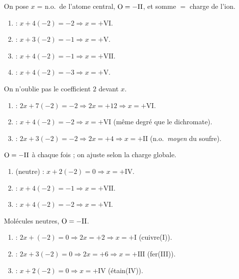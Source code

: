 \documentclass[11pt,a4paper]{article}
\begin{document}
\begin{corrige}
On pose $x$ = n.o.\ de l'atome central, $\ce{O}=-\mathrm{II}$, et somme $=$ charge de l'ion.
\begin{enumerate}[label=\alph*)]
  \item {} : $x+4(-2)=-2 \Rightarrow x=+\mathrm{VI}$.
  \item {} : $x+3(-2)=-1 \Rightarrow x=+\mathrm{V}$.
  \item {} : $x+4(-2)=-1 \Rightarrow x=+\mathrm{VII}$.
  \item {} : $x+4(-2)=-3 \Rightarrow x=+\mathrm{V}$.
\end{enumerate}
\end{corrige}

\begin{corrige}
On n'oublie pas le coefficient $2$ devant $x$.
\begin{enumerate}[label=\alph*)]
  \item {} : $2x+7(-2)=-2 \Rightarrow 2x=+12 \Rightarrow x=+\mathrm{VI}$.
  \item {} : $x+4(-2)=-2 \Rightarrow x=+\mathrm{VI}$ (même degré que le dichromate).
  \item {} : $2x+3(-2)=-2 \Rightarrow 2x=+4 \Rightarrow x=+\mathrm{II}$ (n.o.\ \emph{moyen} du soufre).
\end{enumerate}
\end{corrige}

\begin{corrige}
$\ce{O}=-\mathrm{II}$ à chaque fois ; on ajuste selon la charge globale.
\begin{enumerate}[label=\alph*)]
  \item {} (neutre) : $x+2(-2)=0 \Rightarrow x=+\mathrm{IV}$.
  \item {} : $x+4(-2)=-1 \Rightarrow x=+\mathrm{VII}$.
  \item {} : $x+4(-2)=-2 \Rightarrow x=+\mathrm{VI}$.
\end{enumerate}
\end{corrige}

\begin{corrige}
Molécules neutres, $\ce{O}=-\mathrm{II}$.
\begin{enumerate}[label=\alph*)]
  \item {} : $2x+(-2)=0 \Rightarrow 2x=+2 \Rightarrow x=+\mathrm{I}$ (cuivre(I)).
  \item {} : $2x+3(-2)=0 \Rightarrow 2x=+6 \Rightarrow x=+\mathrm{III}$ (fer(III)).
  \item {} : $x+2(-2)=0 \Rightarrow x=+\mathrm{IV}$ (étain(IV)).
\end{enumerate}
\end{corrige}
\end{document}
